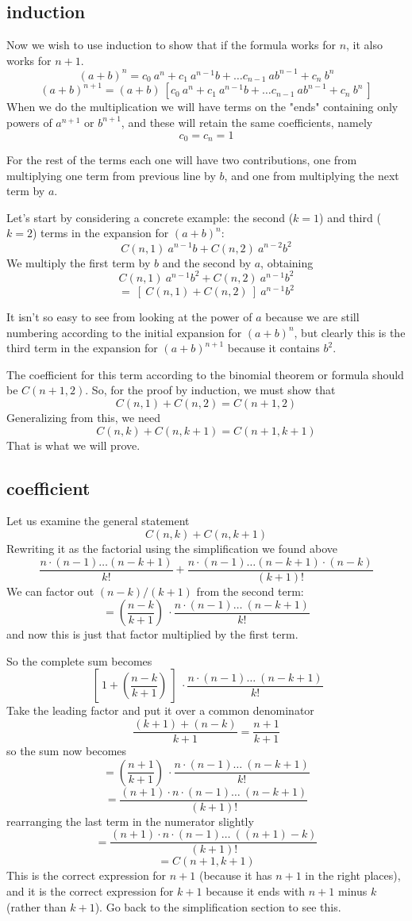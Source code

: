 \documentclass[11pt, oneside]{article}   	%
\begin{document}
\subsection*{induction}
Now we wish to use induction to show that if the formula works for $n$, it also works for $n+1$.
\[ (a+b)^{n} = c_0 \ a^n + c_1 \ a^{n-1}b + \dots c_{n-1} \ a b^{n-1} + c_n \ b^n  \]
\[ (a+b)^{n+1} =  (a+b) \ [ c_0 \ a^n + c_1 \ a^{n-1}b + \dots c_{n-1} \ a b^{n-1} + c_n \ b^n \ ] \]
When we do the multiplication we will have terms on the "ends" containing only powers of $a^{n+1}$ or $b^{n+1}$, and these will retain the same coefficients, namely
\[ c_0 = c_n = 1 \]

For the rest of the terms each one will have two contributions, one from multiplying one term from previous line by $b$, and one from multiplying the next term by $a$.

Let's start by considering a concrete example:  the second ($k=1$) and third ($k=2$) terms in the expansion for $(a+b)^n$:
\[ C(n,1) \ a^{n-1} b + C(n,2) \ a^{n-2}b^2 \]
We multiply the first term by $b$ and the second by $a$, obtaining
\[ C(n,1) \ a^{n-1} b^2 + C(n,2) \ a^{n-1}b^2 \]
\[ = \ [ \ C(n,1)  + C(n,2) \ ] \ a^{n-1}b^2 \]

It isn't so easy to see from looking at the power of $a$ because we are still numbering according to the initial expansion for $(a+b)^n$, but clearly this is the third term in the expansion for $(a+b)^{n+1}$ because it contains $b^2$.

The coefficient for this term according to the binomial theorem or formula should be $C(n+1,2)$.  So, for the proof by induction, we must show that
\[ C(n,1)  + C(n,2) = C(n+1, 2) \]
Generalizing from this, we need
\[ C(n,k) + C(n,k+1) = C(n+1,k+1) \]
That is what we will prove.
\subsection*{coefficient}
Let us examine the general statement
\[ C(n,k) + C(n,k+1) \]
Rewriting it as the factorial using the simplification we found above
\[ \frac{n \cdot (n-1) \dots (n-k+1)}{k!} + \frac{n \cdot (n-1) \dots (n-k+1) \cdot (n-k)}{(k+1)!} \]
We can factor out $(n-k)/(k+1)$ from the second term:
\[ = (\frac{n-k}{k+1}) \ \cdot \frac{n \cdot (n-1) \dots \ (n-k+1) }{k!}  \]
and now this is just that factor multiplied by the first term.

So the complete sum becomes
\[ \ [ \ 1 + (\frac{n-k}{k+1})  \ ] \  \cdot \frac{n \cdot (n-1) \dots \ (n-k+1) }{k!}  \]
Take the leading factor and put it over a common denominator
\[ \frac{(k+1) + (n-k)}{k+1} = \frac{n+1}{k+1} \]
so the sum now becomes
\[ = ( \frac{n+1}{k+1} ) \  \cdot \frac{n \cdot (n-1) \dots \ (n-k+1) }{k!}  \]
\[ = \frac{(n+1) \cdot n \cdot (n-1) \dots \ (n-k+1) }{(k+1)!}  \]
rearranging the last term in the numerator slightly
\[ = \frac{(n+1) \cdot n \cdot (n-1) \dots \ ((n+1)-k) }{(k+1)!}  \]
\[ = C(n+1,k+1) \]
This is the correct expression for $n+1$ (because it has $n+1$ in the right places), and it is the correct expression for $k+1$ because it ends with $n+1$ minus $k$ (rather than $k+1$).  Go back to the simplification section to see this.
\end{document}
